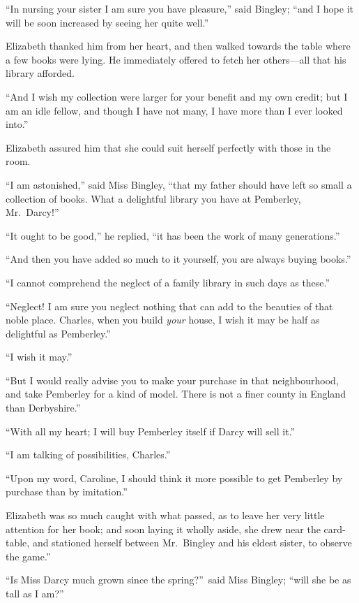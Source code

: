 \documentclass[12pt,english,oneside]{book}
\begin{document}
{}``In nursing your sister I am sure you have pleasure,'' said Bingley;
{}``and I hope it will be soon increased by seeing her quite well.''

Elizabeth thanked him from her heart, and then walked towards the
table where a few books were lying. He immediately offered to fetch
her others\mbox{---}all that his library afforded.

{}``And I wish my collection were larger for your benefit and my
own credit; but I am an idle fellow, and though I have not many, I
have more than I ever looked into.''

Elizabeth assured him that she could suit herself perfectly with those
in the room.

{}``I am astonished,'' said Miss Bingley, {}``that my father should
have left so small a collection of books. What a delightful library
you have at Pemberley, Mr.\ Darcy!''\ 

{}``It ought to be good,'' he replied, {}``it has been the work
of many generations.''

{}``And then you have added so much to it yourself, you are always
buying books.''

{}``I cannot comprehend the neglect of a family library in such days
as these.''

{}``Neglect! I am sure you neglect nothing that can add to the beauties
of that noble place. Charles, when you build \textit{your} house,
I wish it may be half as delightful as Pemberley.''

{}``I wish it may.''

{}``But I would really advise you to make your purchase in that neighbourhood,
and take Pemberley for a kind of model. There is not a finer county
in England than Derbyshire.''

{}``With all my heart; I will buy Pemberley itself if Darcy will
sell it.''

{}``I am talking of possibilities, Charles.''

{}``Upon my word, Caroline, I should think it more possible to get
Pemberley by purchase than by imitation.''

Elizabeth was so much caught with what passed, as to leave her very
little attention for her book; and soon laying it wholly aside, she
drew near the card-table, and stationed herself between Mr.\ Bingley
and his eldest sister, to observe the game.''

{}``Is Miss Darcy much grown since the spring?''\ said Miss Bingley;
{}``will she be as tall as I am?''\ 
\end{document}
